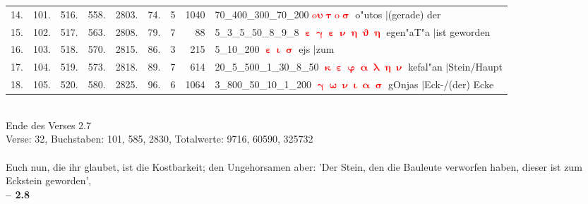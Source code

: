 \documentclass[a4paper,10pt,landscape]{article}
\begin{document}
\begin{tabular}{rrrrrrrrp{120mm}}
14.&101.&516.&558.&2803.&74.&5&1040&70\_400\_300\_70\_200 \textcolor{red}{$\boldsymbol{\mathrm{o}\upsilon\uptau\mathrm{o}\upsigma}$} o"utos $|$(gerade) der\\
15.&102.&517.&563.&2808.&79.&7&88&5\_3\_5\_50\_8\_9\_8 \textcolor{red}{$\boldsymbol{\upepsilon\upgamma\upepsilon\upnu\upeta\upvartheta\upeta}$} egen"aT"a $|$ist geworden\\
16.&103.&518.&570.&2815.&86.&3&215&5\_10\_200 \textcolor{red}{$\boldsymbol{\upepsilon\upiota\upsigma}$} ejs $|$zum\\
17.&104.&519.&573.&2818.&89.&7&614&20\_5\_500\_1\_30\_8\_50 \textcolor{red}{$\boldsymbol{\upkappa\upepsilon\upvarphi\upalpha\uplambda\upeta\upnu}$} kefal"an $|$Stein/Haupt\\
18.&105.&520.&580.&2825.&96.&6&1064&3\_800\_50\_10\_1\_200 \textcolor{red}{$\boldsymbol{\upgamma\upomega\upnu\upiota\upalpha\upsigma}$} gOnjas $|$Eck-/(der) Ecke\\
\end{tabular}\medskip \\
Ende des Verses 2.7\\
Verse: 32, Buchstaben: 101, 585, 2830, Totalwerte: 9716, 60590, 325732\\
\\
Euch nun, die ihr glaubet, ist die Kostbarkeit; den Ungehorsamen aber: 'Der Stein, den die Bauleute verworfen haben, dieser ist zum Eckstein geworden',\\
\newpage 
{\bf -- 2.8}\\
\medskip \\
\end{document}
